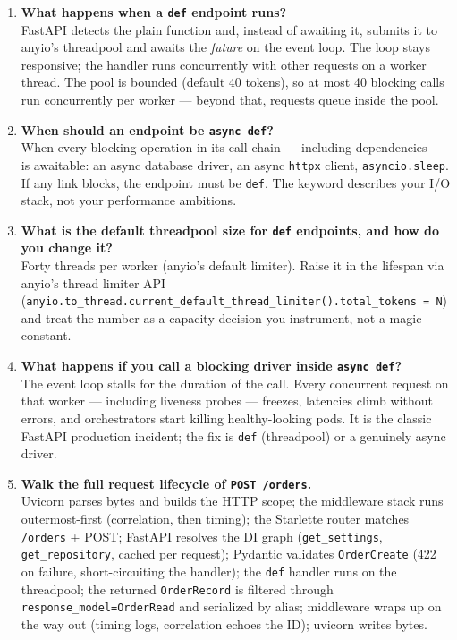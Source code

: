 \begin{enumerate}[label=\textbf{Q\arabic*.}, leftmargin=1.3cm, itemsep=0.8em]
\item \textbf{What happens when a \texttt{def} endpoint runs?}\\
FastAPI detects the plain function and, instead of awaiting it, submits it
to anyio's threadpool and awaits the \emph{future} on the event loop. The
loop stays responsive; the handler runs concurrently with other requests on
a worker thread. The pool is bounded (default 40 tokens), so at most 40
blocking calls run concurrently per worker --- beyond that, requests queue
inside the pool.

\item \textbf{When should an endpoint be \texttt{async def}?}\\
When every blocking operation in its call chain --- including dependencies
--- is awaitable: an async database driver, an async \texttt{httpx} client,
\texttt{asyncio.sleep}. If any link blocks, the endpoint must be
\texttt{def}. The keyword describes your I/O stack, not your performance
ambitions.

\item \textbf{What is the default threadpool size for \texttt{def}
endpoints, and how do you change it?}\\
Forty threads per worker (anyio's default limiter). Raise it in the lifespan
via anyio's thread limiter API
(\texttt{anyio.to\_thread.current\_default\_thread\_limiter().total\_tokens
= N}) and treat the number as a capacity decision you instrument, not a
magic constant.

\item \textbf{What happens if you call a blocking driver inside
\texttt{async def}?}\\
The event loop stalls for the duration of the call. Every concurrent
request on that worker --- including liveness probes --- freezes, latencies
climb without errors, and orchestrators start killing healthy-looking pods.
It is the classic FastAPI production incident; the fix is \texttt{def}
(threadpool) or a genuinely async driver.

\item \textbf{Walk the full request lifecycle of \texttt{POST /orders}.}\\
Uvicorn parses bytes and builds the HTTP scope; the middleware stack runs
outermost-first (correlation, then timing); the Starlette router matches
\texttt{/orders} + POST; FastAPI resolves the DI graph (\texttt{get\_settings},
\texttt{get\_repository}, cached per request); Pydantic validates
\texttt{OrderCreate} (422 on failure, short-circuiting the handler); the
\texttt{def} handler runs on the threadpool; the returned
\texttt{OrderRecord} is filtered through \texttt{response\_model=OrderRead}
and serialized by alias; middleware wraps up on the way out (timing logs,
correlation echoes the ID); uvicorn writes bytes.


\end{enumerate}
